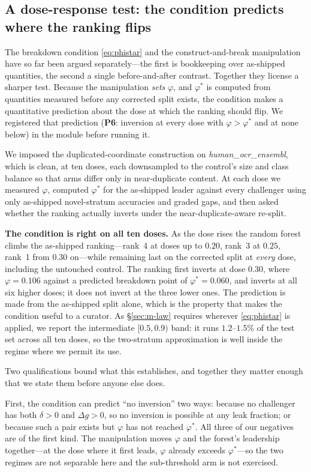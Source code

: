 \documentclass[webpdf,modern,large,namedate]{oup-authoring-template}%
\begin{document}
\subsection{A dose-response test: the condition predicts where the ranking flips}\label{sec:r-dose}
The breakdown condition \eqref{eq:phistar} and the construct-and-break manipulation have so far been argued separately---the first is bookkeeping over as-shipped quantities, the second a single before-and-after contrast. Together they license a sharper test. Because the manipulation \emph{sets} $\varphi$, and $\varphi^{*}$ is computed from quantities measured before any corrected split exists, the condition makes a quantitative prediction about the dose at which the ranking should flip. We registered that prediction (\textbf{P6}: inversion at every dose with $\varphi>\varphi^{*}$ and at none below) in the module before running it.

We imposed the duplicated-coordinate construction on \textit{human\_ocr\_ensembl}, which is clean, at ten doses, each downsampled to the control's size and class balance so that arms differ only in near-duplicate content. At each dose we measured $\varphi$, computed $\varphi^{*}$ for the as-shipped leader against every challenger using only as-shipped novel-stratum accuracies and graded gaps, and then asked whether the ranking actually inverts under the near-duplicate-aware re-split.

\textbf{The condition is right on all ten doses.} As the dose rises the random forest climbs the as-shipped ranking---rank~4 at doses up to $0.20$, rank~3 at $0.25$, rank~1 from $0.30$ on---while remaining last on the corrected split at \emph{every} dose, including the untouched control. The ranking first inverts at dose $0.30$, where $\varphi=0.106$ against a predicted breakdown point of $\varphi^{*}=0.060$, and inverts at all six higher doses; it does not invert at the three lower ones. The prediction is made from the as-shipped split alone, which is the property that makes the condition useful to a curator. As \S\ref{sec:m-law} requires wherever \eqref{eq:phistar} is applied, we report the intermediate $[0.5,0.9)$ band: it runs $1.2$--$1.5\%$ of the test set across all ten doses, so the two-stratum approximation is well inside the regime where we permit its use.

Two qualifications bound what this establishes, and together they matter enough that we state them before anyone else does.

First, the condition can predict ``no inversion'' two ways: because no challenger has both $\delta>0$ and $\Delta g>0$, so no inversion is possible at any leak fraction; or because such a pair exists but $\varphi$ has not reached $\varphi^{*}$. All three of our negatives are of the first kind. The manipulation moves $\varphi$ and the forest's leadership together---at the dose where it first leads, $\varphi$ already exceeds $\varphi^{*}$---so the two regimes are not separable here and the sub-threshold arm is not exercised.
\end{document}
